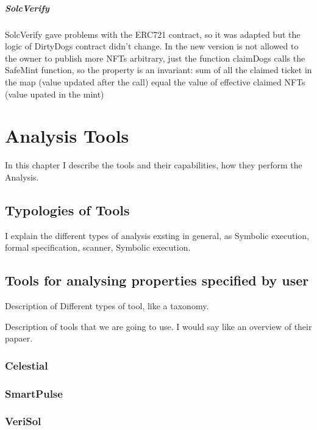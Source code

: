 \paragraph{SolcVerify}
SolcVerify gave problems with the ERC721 contract, so it was adapted but the logic of DirtyDogs contract didn't change. 
In the new version is not allowed to the owner to publish more NFTs arbitrary, just the function claimDogs calls the SafeMint 
function, so the property is an invariant: 
sum of all the claimed ticket in the map (value updated after the call) equal the value of effective claimed NFTs (value upated in the mint)


\chapter{Analysis Tools}
\label{ch:Tools}
In this chapter I describe the tools and their capabilities, how they perform the Analysis.

\section{Typologies of Tools}
\label{sec:Tools:Typologies}
I explain the different types of analysis exsting in general, as Symbolic execution, formal specification, scanner, Symbolic execution.

\section{Tools for analysing properties specified by user}
\label{sec:Tools:Specification}
Description of Different types of tool, like a taxonomy.

Description of tools that we are going to use. 
I would say like an overview of their papaer.

\subsection{Celestial}
\label{sec:Specification:Celestial}


\subsection{SmartPulse}
\label{sec:Specification:SmartPulse}

\subsection{VeriSol}
\label{sec:Specification:VeriSol}



